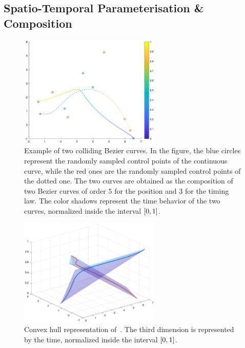 \subsection{Spatio-Temporal Parameterisation \& Composition}%
\label{SEC:ST-PARAM-COMPOSITION}
\begin{figure}[!t]
	\centering
	\includegraphics[width=0.6\textwidth]{Figs/Chapter6/st_bezier_timetraj_coll.eps}
	\caption{Example of two colliding B\acuteacc ezier curves. In the figure, the blue circles represent the randomly sampled
    control points of the continuous curve, while the red ones are the randomly sampled control points of the dotted one.
    The two curves are obtained as the composition of two B\acuteacc ezier curves of order $5$ for the position and $3$ for
    the timing law. The color shadows represent the time behavior of the two curves, normalized inside the interval $\left[ 0, 1\right]$.}
	\label{FIG:ST-BEZIER-COLLIDING-TRAJ}
\end{figure}
\begin{figure}[!t]
	\centering
	\includegraphics[width=0.6\textwidth]{Figs/Chapter6/st_bezier_convexhull_coll.eps}
	\caption{Convex hull representation of~. The third dimension is represented by the time,
    normalized inside the interval $\left[ 0, 1\right]$.}
	\label{FIG:ST-BEZIER-COLLIDING-CONVEX}
\end{figure}
